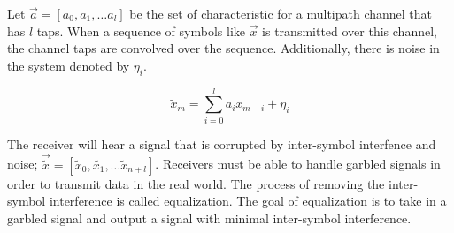 Let $\vec{a} = [a_0, a_1, \ldots a_l]$ be the set of characteristic for a multipath channel that has $l$ taps. When a sequence of symbols like $\vec{x}$ is transmitted over this channel, the channel taps are convolved over the sequence.  Additionally, there is noise in the system denoted by $\eta_i$. 

$$\tilde{x}_m = \sum_{i=0}^l a_i x_{m-i} + \eta_i$$

The receiver will hear a signal that is corrupted by inter-symbol interfence and noise;
$\vec{\tilde{x}}=[\tilde{x}_0, \tilde{x_1}, \ldots \tilde{x}_{n+l}]$. 
Receivers must be able to handle garbled signals in order to transmit data in the real world.  The process of removing the inter-symbol interference is called equalization.  The goal of equalization is to take in a garbled signal and output a signal with minimal inter-symbol interference. 

